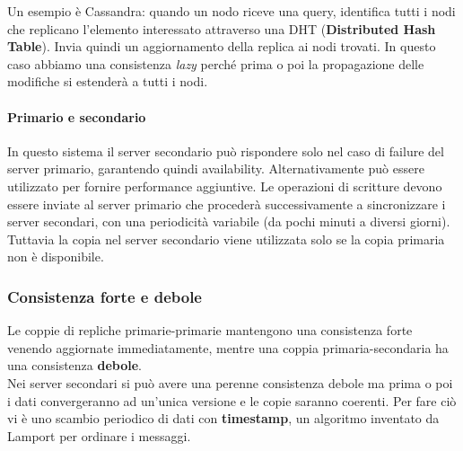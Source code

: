 \documentclass{article}
\begin{document}
		Un esempio è Cassandra: quando un nodo riceve una query, identifica tutti i nodi che replicano l'elemento interessato attraverso una DHT (\textbf{Distributed Hash Table}). Invia quindi un aggiornamento della replica ai nodi trovati. In questo caso abbiamo una consistenza \textit{lazy} perché prima o poi la propagazione delle modifiche si estenderà a tutti i nodi.
		
		\paragraph{Primario e secondario}
		In questo sistema il server secondario può rispondere solo nel caso di failure del server primario, garantendo quindi availability. Alternativamente può essere utilizzato per fornire performance aggiuntive. Le operazioni di scritture devono essere inviate al server primario che procederà successivamente a sincronizzare i server secondari, con una periodicità variabile (da pochi minuti a diversi giorni). Tuttavia la copia nel server secondario viene utilizzata solo se la copia primaria non è disponibile.
		
		\subsubsection{Consistenza forte e debole}
		Le coppie di repliche primarie-primarie mantengono una consistenza forte venendo aggiornate immediatamente, mentre una coppia primaria-secondaria ha una consistenza \textbf{debole}.\\
		Nei server secondari si può avere una perenne consistenza debole ma prima o poi i dati convergeranno ad un'unica versione e le copie saranno coerenti. Per fare ciò vi è uno scambio periodico di dati con \textbf{timestamp}, un algoritmo inventato da Lamport per ordinare i messaggi.\\
		
\end{document}
